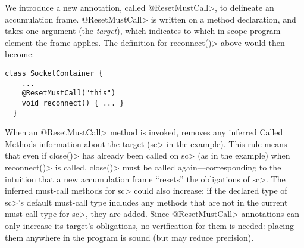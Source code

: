 We introduce a new annotation, called \<@ResetMustCall>, to delineate
an accumulation frame. \<@ResetMustCall> is written on a method
declaration, and takes one argument (the \emph{target}), which
indicates to which in-scope program element the frame applies. The
definition for \<reconnect()> above would then become:

\begin{lstlisting}[frame=tb,belowskip=3mm]
  class SocketContainer {
    ...
    @ResetMustCall("this")
    void reconnect() { ... }
  }
\end{lstlisting}
When an \<@ResetMustCall>
method is invoked, \Tool removes any
inferred Called Methods information about the target (\<sc> in the example).
This rule means that even if \<close()> has already been called on \<sc>
(as in the example)
when \<reconnect()>
is called, \<close()> must be called again---corresponding to the intuition
that a new accumulation frame ``resets'' the obligations of \<sc>.
The inferred must-call methods for \<sc> could also increase:
if the declared type of \<sc>'s default must-call type includes any
methods that are not in the current must-call type for \<sc>, they are added.
Since \<@ResetMustCall> annotations can only increase its target's obligations,
no verification for them is needed: placing them anywhere in the program is sound
(but may reduce precision).

